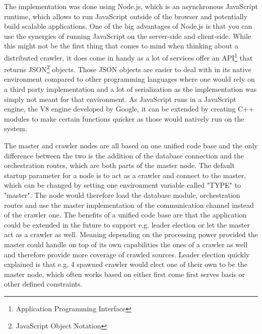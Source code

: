 The implementation was done using Node.js, which is an asynchronous JavaScript runtime, which allows to run JavaScript outside of the browser and potentially build scalable applications. One of the big advantages of Node.js is that you can use the synergies of running JavaScript on the server-side and client-side. While this might not be the first thing that comes to mind when thinking about a distributed crawler, it does come in handy as a lot of services offer an API\footnote{Application Programming Interface} that returns JSON\footnote{JavaScript Object Notation} objects. Those JSON objects are easier to deal with in its native environment compared to other programming languages where one would rely on a third party implementation and a lot of serialization as the implementation was simply not meant for that environment.
As JavaScript runs in a JavaScript engine, the V8 engine developed by Google, it can be extended by creating C++ modules to make certain functions quicker as those would natively run on the system.

The master and crawler nodes are all based on one unified code base and the only difference between the two is the addition of the database connection and the orchestration routes, which are both parts of the master node. The default startup parameter for a node is to act as a crawler and connect to the master, which can be changed by setting one environment variable called "TYPE" to "master". The node would therefore load the database module, orchestration routes and use the master implementation of the communication channel instead of the crawler one.
The benefits of a unified code base are that the application could be extended in the future to support e.g. leader election or let the master act as a crawler as well. Meaning depending on the processing power provided the master could handle on top of its own capabilities the ones of a crawler as well and therefore provide more coverage of crawled sources.
Leader election quickly explained is that e.g. 4 spawned crawler would elect one of their own to be the master node, which often works based on either first come first serves basis or other defined constraints.

